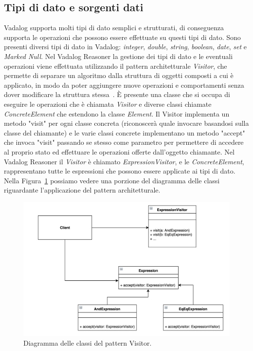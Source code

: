 \subsection{Tipi di dato e sorgenti dati}

Vadalog supporta molti tipi di dato semplici e strutturati, di conseguenza supporta le operazioni che possono essere effettuate su questi tipi di dato. Sono presenti diversi tipi di dato in Vadalog: \emph{integer}, \emph{double}, \emph{string}, \emph{boolean}, \emph{date}, \emph{set} e \emph{Marked Null}. \newline
Nel Vadalog Reasoner la gestione dei tipi di dato e le eventuali operazioni viene effettuata utilizzando il pattern architetturale \emph{Visitor}, che permette di separare un algoritmo dalla struttura di oggetti composti a cui è applicato, in modo da poter aggiungere nuove operazioni e comportamenti senza dover modificare la struttura stessa~\cite{gamma1995design}. È presente una classe che si occupa di eseguire le operazioni che è chiamata \emph{Visitor} e diverse classi chiamate \emph{ConcreteElement} che estendono la classe \emph{Element}. Il Visitor implementa un metodo "visit" per ogni classe concreta (riconoscerà quale invocare basandosi sulla classe del chiamante) e le varie classi concrete implementano un metodo "accept" che invoca "visit" passando se stesso come parametro per permettere di accedere al proprio stato ed effettuare le operazioni offerte dall'oggetto chiamante. \newline
Nel Vadalog Reasoner il \emph{Visitor} è chiamato \emph{ExpressionVisitor}, e le \emph{ConcreteElement}, rappresentano tutte le espressioni che possono essere applicate ai tipi di dato. Nella Figura~\ref{fig:visitoruml} possiamo vedere una porzione del diagramma delle classi riguardante l'applicazione del pattern architetturale. 
\begin{figure}[h]
	\centering
	\includegraphics[width=0.8\linewidth]{figure/visitor_uml}
	\caption{Diagramma delle classi del pattern Visitor.}
	\label{fig:visitoruml}
\end{figure}


